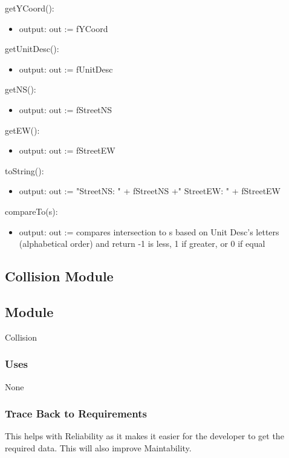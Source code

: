 \documentclass[12pt]{article}
\begin{document}
\noindent getYCoord():
\begin{itemize}
    \item output: out := fYCoord
\end{itemize}

\noindent getUnitDesc():
\begin{itemize}
    \item output: out := fUnitDesc
\end{itemize}

\noindent getNS():
\begin{itemize}
    \item output: out := fStreetNS
\end{itemize}

\noindent getEW():
\begin{itemize}
    \item output: out := fStreetEW
\end{itemize}

\noindent toString():
\begin{itemize}
    \item output: out := "StreetNS: " + fStreetNS +" StreetEW: " + fStreetEW
\end{itemize}

\noindent compareTo(s):
\begin{itemize}
    \item output: out := compares intersection to s based on Unit Desc's letters (alphabetical order) and return -1 is less, 1 if greater, or 0 if equal
\end{itemize}

\newpage
\subsection{Collision Module}
\subsection*{Module}
Collision

\subsubsection*{Uses}
None

\subsubsection*{Trace Back to Requirements}
This helps with Reliability as it makes it easier for the developer to get the required data. This will also improve Maintability.
\end{document}
